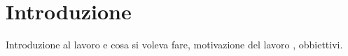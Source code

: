 \chapter{Introduzione}

\begin{commento}
	Introduzione al lavoro e cosa si voleva fare, motivazione del lavoro , obbiettivi.
\end{commento}